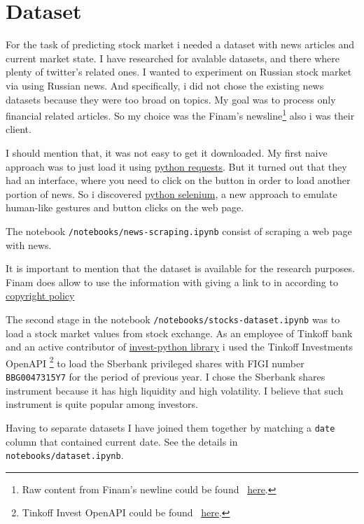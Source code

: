 \documentclass{article}
\begin{document}
\section{Dataset}

For the task of predicting stock market i needed a dataset with news articles and current market state.
I have researched for avalable datasets, and there where plenty of twitter's related ones.
I wanted to experiment on Russian stock market via using Russian news. 
And specifically, i did not chose the existing news datasets because they were too broad on topics. My goal was to process only financial related articles.
So my choice was the Finam's newsline\footnote{Raw content from Finam's newline could be found ~\href{https://www.finam.ru/publications/selection/united/}{here}.} also i was their client.

I should mention that, it was not easy to get it downloaded. 
My first naive approach was to just load it using \href{https://pypi.org/project/requests/}{python requests}. But it turned out that they had an interface, where you need to click on the button in order to load another portion of news. So i discovered \href{https://pypi.org/project/selenium/}{python selenium}, a new approach to emulate human-like gestures and button clicks on the web page.

The notebook \texttt{/notebooks/news-scraping.ipynb} consist of scraping a web page with news.

It is important to mention that the dataset is available for the research purposes. 
Finam does allow to use the information with giving a link to in according to \href{https://www.finam.ru/about/copyright/}{copyright policy}

The second stage in the notebook \texttt{/notebooks/stocks-dataset.ipynb} was to load a stock market values from stock exchange. 
As an employee of Tinkoff bank and an active contributor of \href{https://github.com/Tinkoff/invest-python}{invest-python library} i used the Tinkoff Investments OpenAPI \footnote{Tinkoff Invest OpenAPI could be found ~\href{https://www.tinkoff.ru/invest/open-api/}{here}.} to load the Sberbank privileged shares with FIGI number \texttt{BBG0047315Y7} for the period of previous year. I chose the Sberbank shares instrument because it has high liquidity and high volatility. I believe that such instrument is quite popular among investors.

Having to separate datasets I have joined them together by matching a \texttt{date} column that contained current date. 
See the details in \texttt{notebooks/dataset.ipynb}.
\end{document}
